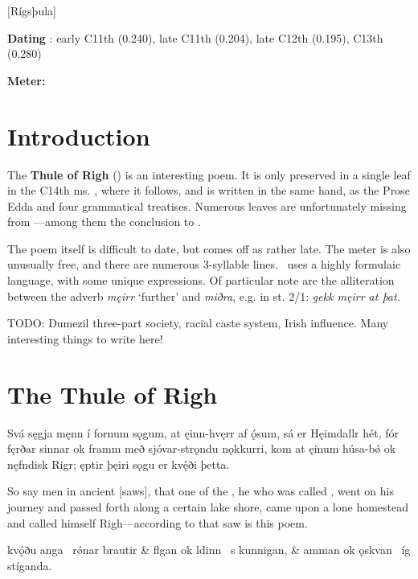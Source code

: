 [Rígsþula]

\begin{flushright}%
\textbf{Dating} \parencite{Sapp2022}: early C11th (0.240), late C11th (0.204), late C12th (0.195), C13th (0.280)

\textbf{Meter:} \Fornyrdislag%
\end{flushright}

\section{Introduction}

The \textbf{Thule of Righ} (\Rigsthula) is an interesting poem.  It is only preserved in a single leaf in the C14th ms. \Wormianus, where it follows, and is written in the same hand, as the Prose Edda and four grammatical treatises.  Numerous leaves are unfortunately missing from \Wormianus—among them the conclusion to \Rigsthula.

The poem itself is difficult to date, but comes off as rather late.  The meter is also unusually free, and there are numerous 3-syllable lines.  \Rigsthula\ uses a highly formulaic language, with some unique expressions.  Of particular note are the alliteration between the adverb \emph{męirr} ‘further’ and \emph{miðra}, e.g. in st. 2/1: \emph{gekk męirr at þat}.

TODO: Dumezil three-part society, racial caste system, Irish influence. Many interesting things to write here!

\sectionline

\section{The Thule of Righ}%

\bpg\bpa{}%
Svá sęgja męnn í fornum sǫgum, at ęinn-hvęrr af ǫ́sum, sá er Hęimdallr hét, fór fęrðar sinnar ok framm með sjóvar-strǫndu nǫkkurri, kom at ęinum húsa-bǿ ok nęfndisk Rigr; ęptir þęiri sǫgu er kvę́ði þetta.\epa

\bpb So say men in ancient [saws], that one of the , he who was called , went on his journey and passed forth along a certain lake shore, came upon a lone homestead and called himself Righ—according to that saw is this poem.\epb\epg


\bvg\bva{}%
 kvǫ́ðu anga \hld\ rǿnar brautir &
flgan ok ldinn \hld\ s kunnigan, &
amman ok ǫskvan \hld\ íg stíganda.\eva

